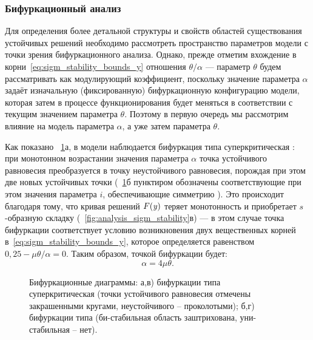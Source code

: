 \subsubsection{Бифуркационный анализ}

Для определения более детальной структуры и свойств областей существования устойчивых решений необходимо рассмотреть пространство параметров модели с точки зрения бифуркационного анализа. Однако, прежде отметим вхождение в корни~\eqref{eq:sigm_stability_bounds_y} отношения $\theta/\alpha$ --- параметр $\theta$ будем рассматривать как модулирующий коэффициент, поскольку значение параметра $\alpha$ задаёт изначальную (фиксированную) бифуркационную конфигурацию модели, которая затем в процессе функционирования будет меняться в соответствии с текущим значением параметра $\theta$. Поэтому в первую очередь мы рассмотрим влияние на модель параметра $\alpha$, а уже затем параметра $\theta$.

Как показано \onfigure~\ref{fig:analysis_sigm_bifurcations}а, в модели наблюдается бифуркация типа суперкритическая : при монотонном возрастании значения параметра $\alpha$ точка устойчивого равновесия преобразуется в точку неустойчивого равновесия, порождая при этом две новых устойчивых точки (\onfigure~\ref{fig:analysis_sigm_bifurcations}б пунктиром обозначены соответствующие при этом значения параметра $i$, обеспечивающие симметрию ). Это происходит благодаря тому, что кривая решений $F(\mathit{y})$ теряет монотонность и приобретает $s$-образную складку (\seefigure~\ref{fig:analysis_sigm_stability}в) --- в этом случае точка бифуркации соответствует условию возникновения двух вещественных корней в~\eqref{eq:sigm_stability_bounds_y}, которое определяется равенством $0,25 - \mu \theta / \alpha = 0$. Таким образом, точкой бифуркации будет:
\begin{equation}
    \label{eq:sigm_bifurcation_alpha}
    \alpha =  4 \mu \theta.
\end{equation}

\begin{figure}[ht]
    \caption{Бифуркационные диаграммы: а,в) бифуркации типа суперкритическая  (точки устойчивого равновесия отмечены закрашенными кругами, неустойчивого -- проколотыми); б,г) бифуркации типа  (би-стабильная область заштрихована, уни-стабильная -- нет).}
    \label{fig:analysis_sigm_bifurcations}
\end{figure}

